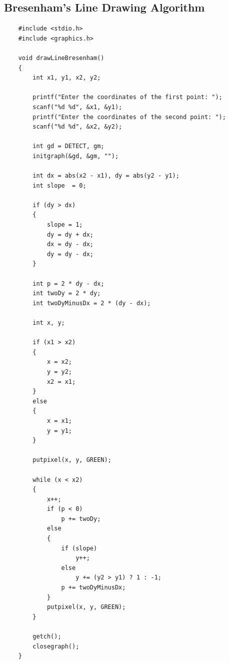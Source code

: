\documentclass[12pt]{article}
\begin{document}
	\subsection{Bresenham's Line Drawing Algorithm}
	\begin{verbatim}
	#include <stdio.h>
	#include <graphics.h>
	
	void drawLineBresenham() 
	{
	    int x1, y1, x2, y2;
	
	    printf("Enter the coordinates of the first point: ");
	    scanf("%d %d", &x1, &y1);
	    printf("Enter the coordinates of the second point: ");
	    scanf("%d %d", &x2, &y2);
	
	    int gd = DETECT, gm;
	    initgraph(&gd, &gm, "");
	
	    int dx = abs(x2 - x1), dy = abs(y2 - y1);
	    int slope  = 0;
	
	    if (dy > dx) 
	    {
	        slope = 1;
	        dy = dy + dx;
	        dx = dy - dx;
	        dy = dy - dx;
	    }
	
	    int p = 2 * dy - dx;
	    int twoDy = 2 * dy;
	    int twoDyMinusDx = 2 * (dy - dx);
	
	    int x, y;
	
	    if (x1 > x2)
	    {
	        x = x2;
	        y = y2;
	        x2 = x1;
	    }
	    else
	    {
	        x = x1;
	        y = y1;
	    }
	
	    putpixel(x, y, GREEN);
	
	    while (x < x2)
	    {
	        x++;
	        if (p < 0)
	            p += twoDy;
	        else
	        {
	            if (slope)
	                y++;
	            else
	                y += (y2 > y1) ? 1 : -1;
	            p += twoDyMinusDx;
	        }
	        putpixel(x, y, GREEN);
	    }
	
	    getch();
	    closegraph();
	}
		
	\end{verbatim}		
\end{document}
